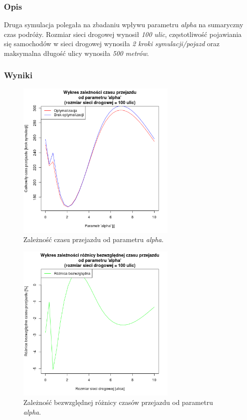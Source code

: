 \documentclass[11pt,a4paper]{article}
\begin{document}
\subsubsection{Opis}

Druga symulacja polegała na zbadaniu wpływu parametru \textit{alpha} na sumaryczny czas podróży. Rozmiar sieci drogowej wynosił \textit{100 ulic}, częstotliwość pojawiania się samochodów w sieci drogowej wynosiła \emph{2 kroki symulacji/pojazd} oraz maksymalna długość ulicy wynosiła \emph{500 metrów}.

\subsubsection{Wyniki}



\begin{figure}[H]
	\centering
		\includegraphics[width=0.7\textwidth]{../images/simulation2}
	\caption{Zależność czasu przejazdu od parametru \textit{alpha}.}
\end{figure}

\begin{figure}[H]
	\centering
		\includegraphics[width=0.7\textwidth]{../images/simulation2_diff}
	\caption{Zależność bezwzględnej różnicy czasów przejazdu od parametru \textit{alpha}.}
\end{figure}
\end{document}
